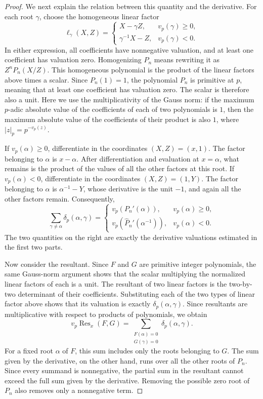 \documentclass[11pt,a4paper]{article}
\numberwithin{equation}{section}
\theoremstyle{definition}
\begin{document}
\begin{proof}
We next explain the relation between this quantity and the derivative. For each root \(\gamma\), choose the homogeneous linear factor
\[
\ell_\gamma(X,Z)=
\begin{cases}
X-\gamma Z,&v_p(\gamma)\ge0,\\
\gamma^{-1}X-Z,&v_p(\gamma)<0.
\end{cases}
\]
In either expression, all coefficients have nonnegative valuation, and at least one coefficient has valuation zero. Homogenizing \(P_n\) means rewriting it as \(Z^nP_n(X/Z)\). This homogeneous polynomial is the product of the linear factors above times a scalar. Since \(P_n(1)=1\), the polynomial \(P_n\) is primitive at \(p\), meaning that at least one coefficient has valuation zero. The scalar is therefore also a unit. Here we use the multiplicativity of the Gauss norm: if the maximum \(p\)-adic absolute value of the coefficients of each of two polynomials is \(1\), then the maximum absolute value of the coefficients of their product is also \(1\), where \(|z|_p=p^{-v_p(z)}\).

If \(v_p(\alpha)\ge0\), differentiate in the coordinates \((X,Z)=(x,1)\). The factor belonging to \(\alpha\) is \(x-\alpha\). After differentiation and evaluation at \(x=\alpha\), what remains is the product of the values of all the other factors at this root. If \(v_p(\alpha)<0\), differentiate in the coordinates \((X,Z)=(1,Y)\). The factor belonging to \(\alpha\) is \(\alpha^{-1}-Y\), whose derivative is the unit \(-1\), and again all the other factors remain. Consequently,
\[
\sum_{\gamma\ne\alpha}\delta_p(\alpha,\gamma)=
\begin{cases}
v_p(P_n'(\alpha)),&v_p(\alpha)\ge0,\\
v_p(\widehat P_n'(\alpha^{-1})),&v_p(\alpha)<0.
\end{cases}
\]
The two quantities on the right are exactly the derivative valuations estimated in the first two parts.

Now consider the resultant. Since \(F\) and \(G\) are primitive integer polynomials, the same Gauss-norm argument shows that the scalar multiplying the normalized linear factors of each is a unit. The resultant of two linear factors is the two-by-two determinant of their coefficients. Substituting each of the two types of linear factor above shows that its valuation is exactly \(\delta_p(\alpha,\gamma)\). Since resultants are multiplicative with respect to products of polynomials, we obtain
\[
v_p\operatorname{Res}_x(F,G)
=\sum_{\substack{F(\alpha)=0\\G(\gamma)=0}}
\delta_p(\alpha,\gamma).
\]
For a fixed root \(\alpha\) of \(F\), this sum includes only the roots belonging to \(G\). The sum given by the derivative, on the other hand, runs over all the other roots of \(P_n\). Since every summand is nonnegative, the partial sum in the resultant cannot exceed the full sum given by the derivative. Removing the possible zero root of \(P_n\) also removes only a nonnegative term.


\end{proof}
\end{document}
